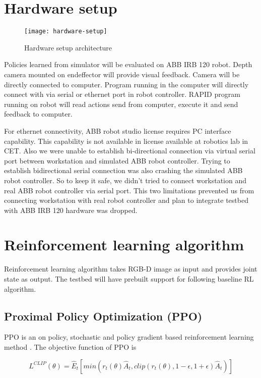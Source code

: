 \section{Hardware setup}
\begin{figure}[H]
	\centering
	\texttt{[image: hardware-setup]}
	\caption{Hardware setup architecture}
	\label{fig:hardware-arch}
\end{figure}

Policies learned from simulator will be evaluated on ABB IRB 120 robot. Depth camera mounted on endeffector will provide visual feedback. Camera will be directly connected to computer. Program running in the computer will directly connect with via serial or ethernet port in robot controller. RAPID program running on robot will read actions send from computer, execute it and send feedback to computer.

For ethernet connectivity, ABB robot studio license requires PC interface capability. This capability is not available in license available at robotics lab in CET. Also we were unable to establish bi-directional connection via virtual serial port between workstation and simulated ABB robot controller. Trying to establish bidirectional serial connection was also crashing the simulated ABB robot controller. So to keep it safe, we didn't tried to connect workstation and real ABB robot controller via serial port. This two limitations prevented us from connecting workstation with real robot controller and plan to integrate testbed with ABB IRB 120 hardware was dropped.

\section{Reinforcement learning algorithm}
Reinforcement learning algorithm takes RGB-D image as input and provides joint state as output. The testbed will have prebuilt support for following baseline RL algorithm.

\subsection{Proximal Policy Optimization (PPO)}
PPO is an on policy, stochastic and policy gradient based reinforcement learning method \cite{ppo}. The objective function of PPO is 

\begin{equation}
L^{CLIP} (\theta) = \hat{E}_t \left[ min(r_t(\theta) \hat{A}_t, clip(r_t(\theta), 1 - \epsilon, 1 + \epsilon) \hat{A}_t) \right]
\end{equation}

